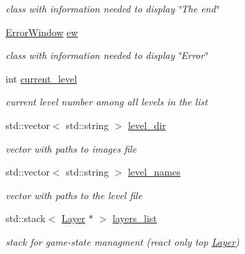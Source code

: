 \begin{DoxyCompactItemize}
\begin{DoxyCompactList}\small\item\em class with information needed to display \char`\"{}\+The end\char`\"{} \end{DoxyCompactList}\item 
\mbox{\label{class_model_a7f547d436448e326441b8170c3ac7835}} 
\hyperlink{class_error_window}{Error\+Window} \hyperlink{class_model_a7f547d436448e326441b8170c3ac7835}{ew}
\begin{DoxyCompactList}\small\item\em class with information needed to display \char`\"{}\+Error\char`\"{} \end{DoxyCompactList}\item 
\mbox{\label{class_model_a72a4ba8da86e13263867c7e4e1cb9205}} 
int \hyperlink{class_model_a72a4ba8da86e13263867c7e4e1cb9205}{current\+\_\+level}
\begin{DoxyCompactList}\small\item\em current level number among all levels in the list \end{DoxyCompactList}\item 
\mbox{\label{class_model_a357abb457c3e8bf987dce2418c6f09b2}} 
std\+::vector$<$ std\+::string $>$ \hyperlink{class_model_a357abb457c3e8bf987dce2418c6f09b2}{level\+\_\+dir}
\begin{DoxyCompactList}\small\item\em vector with paths to images file \end{DoxyCompactList}\item 
\mbox{\label{class_model_a1450c4773eee836985f551c288490bf4}} 
std\+::vector$<$ std\+::string $>$ \hyperlink{class_model_a1450c4773eee836985f551c288490bf4}{level\+\_\+names}
\begin{DoxyCompactList}\small\item\em vector with paths to the level file \end{DoxyCompactList}\item 
\mbox{\label{class_model_ae25f86a150bc0b5c146ebd39567eea2f}} 
std\+::stack$<$ \hyperlink{class_layer}{Layer} $\ast$ $>$ \hyperlink{class_model_ae25f86a150bc0b5c146ebd39567eea2f}{layers\+\_\+list}
\begin{DoxyCompactList}\small\item\em stack for game-\/state managment (react only top \hyperlink{class_layer}{Layer}) \end{DoxyCompactList}\end{DoxyCompactItemize}


